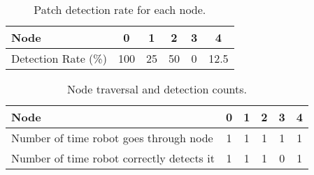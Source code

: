 \documentclass[aspectratio=169,hyperref={pdfpagelabels=false}]{beamer}
\begin{document}
    \begin{frame}
        \begin{adjustwidth}{-3.5em}{-1.5em}
            \begin{table}[ht!]
                \centering
                \begin{tabular}{|l|c|c|c|c|c|}
                    \hline
                    Node                & 0   & 1  & 2  & 3 & 4    \\ \hline
                    Detection Rate (\%) & 100 & 25 & 50 & 0 & 12.5 \\ \hline
                \end{tabular}
                \caption{Patch detection rate for each node.}
            \end{table}%
            \begin{table}[ht]
                \centering
                \begin{tabular}{|l|c|c|c|c|c|}
                    \hline
                    Node                                      & 0 & 1 & 2 & 3 & 4 \\ \hline
                    Number of time robot goes through node    & 1 & 1 & 1 & 1 & 1 \\ \hline
                    Number of time robot correctly detects it & 1 & 1 & 1 & 0 & 1 \\ \hline
                \end{tabular}
                \caption{Node traversal and detection counts.}
            \end{table}%
        \end{adjustwidth}
    \end{frame}
\end{document}

